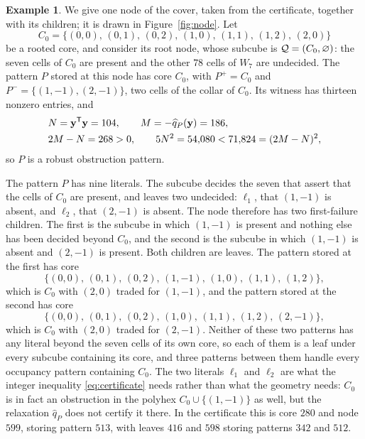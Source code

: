 \documentclass[11pt]{article}
\newcommand\tp{^{\mathsf T}}
\theoremstyle{definition}
\newtheorem{example}[theorem]{Example}
\begin{document}
\begin{example}\label{ex:node}
We give one node of the cover, taken from the certificate, together with its
children; it is drawn in Figure~\ref{fig:node}.  Let
\[
 C_0=\{(0,0),\,(0,1),\,(0,2),\,(1,0),\,(1,1),\,(1,2),\,(2,0)\}
\]
be a rooted core, and consider its root node, whose subcube is
${\mathcal Q}=(C_0,\varnothing)$: the seven cells of $C_0$ are present and the other
$78$ cells of $W_7$ are undecided.  The pattern $P$ stored at this node has
core $C_0$, with $P^{+}=C_0$ and $P^{-}=\{(1,-1),(2,-1)\}$, two cells of the
collar of $C_0$.  Its witness has thirteen nonzero entries, and
\[
\begin{aligned}
 &N=\Zy\tp\Zy=104,\qquad M=-\widehat q_P(\Zy)=186,\\
 &2M-N=268>0,\qquad 5N^{2}=54{,}080<71{,}824=(2M-N)^{2},
\end{aligned}
\]
so $P$ is a robust obstruction pattern.

The pattern $P$ has nine literals.  The subcube decides the seven that assert
that the cells of $C_0$ are present, and leaves two undecided: $\ell_1$, that
$(1,-1)$ is absent, and $\ell_2$, that $(2,-1)$ is absent.  The node
therefore has two first-failure children.  The first is the subcube in which
$(1,-1)$ is present and nothing else has been decided beyond $C_0$, and the
second is the subcube in which $(1,-1)$ is absent and $(2,-1)$ is present.  Both
children are leaves.  The pattern stored at the first has core
\[
 \{(0,0),\,(0,1),\,(0,2),\,(1,-1),\,(1,0),\,(1,1),\,(1,2)\} ,
\]
which is $C_0$ with $(2,0)$ traded for $(1,-1)$, and the pattern stored at
the second has core
\[
 \{(0,0),\,(0,1),\,(0,2),\,(1,0),\,(1,1),\,(1,2),\,(2,-1)\} ,
\]
which is $C_0$ with $(2,0)$ traded for $(2,-1)$.  Neither of these two
patterns has any literal beyond the seven cells of its own core, so each of
them is a leaf under every subcube containing its core, and three patterns
between them handle every occupancy pattern containing $C_0$.  The two
literals $\ell_1$ and $\ell_2$ are what the integer inequality
\eqref{eq:certificate} needs
rather than what the geometry needs: $C_0$ is in fact an obstruction in the
polyhex $C_0\cup\{(1,-1)\}$ as well, but the relaxation $\widehat q_P$ does
not certify it there.  In the certificate this is core $280$ and node $599$,
storing pattern $513$, with leaves $416$ and $598$ storing patterns $342$ and
$512$.
\end{example}
\end{document}
